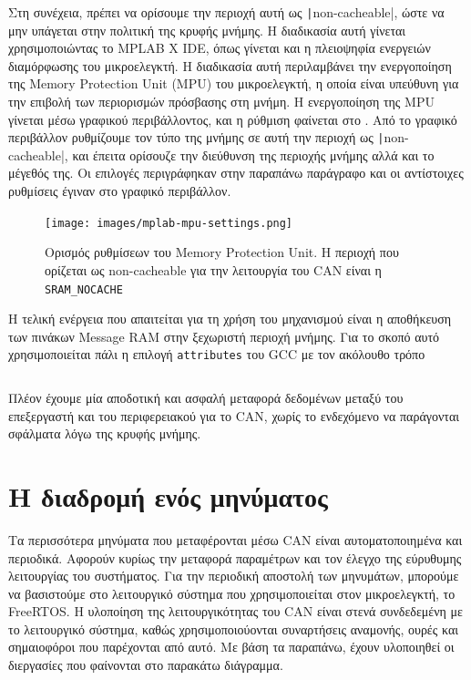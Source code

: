 \documentclass[a4paper,nobib,justified]{tufte-book}
\begin{document}
Στη συνέχεια, πρέπει να ορίσουμε την περιοχή αυτή ως \texttt|non-cacheable|, ώστε να μην υπάγεται στην πολιτική της κρυφής μνήμης. Η διαδικασία αυτή γίνεται χρησιμοποιώντας το MPLAB X IDE, όπως γίνεται και η πλειοψηφία ενεργειών διαμόρφωσης του μικροελεγκτή. Η διαδικασία αυτή περιλαμβάνει την ενεργοποίηση της Memory Protection Unit (MPU) του μικροελεγκτή, η οποία είναι υπεύθυνη για την επιβολή των περιορισμών πρόσβασης στη μνήμη. Η ενεργοποίηση της MPU γίνεται μέσω γραφικού περιβάλλοντος, και η ρύθμιση φαίνεται στο . Από το γραφικό περιβάλλον ρυθμίζουμε τον τύπο της μνήμης σε αυτή την περιοχή ως \texttt|non-cacheable|, και έπειτα ορίσουζε την διεύθυνση της περιοχής μνήμης αλλά και το μέγεθός της. Οι επιλογές περιγράφηκαν στην παραπάνω παράγραφο και οι αντίστοιχες ρυθμίσεις έγιναν στο γραφικό περιβάλλον.

\begin{figure}
	\texttt{[image: images/mplab-mpu-settings.png]}
	\label{fig:mpu-settings}
	\caption[Ορισμός ρυθμίσεων της MPU]{Ορισμός ρυθμίσεων του Memory Protection Unit. Η περιοχή που ορίζεται ως non-cacheable για την λειτουργία του CAN είναι η \texttt{SRAM\_NOCACHE}}
\end{figure}

Η τελική ενέργεια που απαιτείται για τη χρήση του μηχανισμού είναι η αποθήκευση των πινάκων Message RAM στην ξεχωριστή περιοχή μνήμης. Για το σκοπό αυτό χρησιμοποιείται πάλι η επιλογή \texttt{attributes} του GCC με τον ακόλουθο τρόπο \inputminted{c++}{code/examples/message-ram/full.cpp}

Πλέον έχουμε μία αποδοτική και ασφαλή μεταφορά δεδομένων μεταξύ του επεξεργαστή και του περιφερειακού για το CAN, χωρίς το ενδεχόμενο να παράγονται σφάλματα λόγω της κρυφής μνήμης.

\section{Η διαδρομή ενός μηνύματος}

Τα περισσότερα μηνύματα που μεταφέρονται μέσω CAN είναι αυτοματοποιημένα και περιοδικά. Αφορούν κυρίως την μεταφορά παραμέτρων και τον έλεγχο της εύρυθυμης λειτουργίας του συστήματος. Για την περιοδική αποστολή των μηνυμάτων, μπορούμε να βασιστούμε στο λειτουργικό σύστημα που χρησιμοποιείται στον μικροελεγκτή, το FreeRTOS. Η υλοποίηση της λειτουργικότητας του CAN είναι στενά συνδεδεμένη με το λειτουργικό σύστημα, καθώς χρησιμοποιούονται συναρτήσεις αναμονής, ουρές και σημαιοφόροι που παρέχονται από αυτό. Με βάση τα παραπάνω, έχουν υλοποιηθεί οι διεργασίες που φαίνονται στο παρακάτω διάγραμμα.
\end{document}
